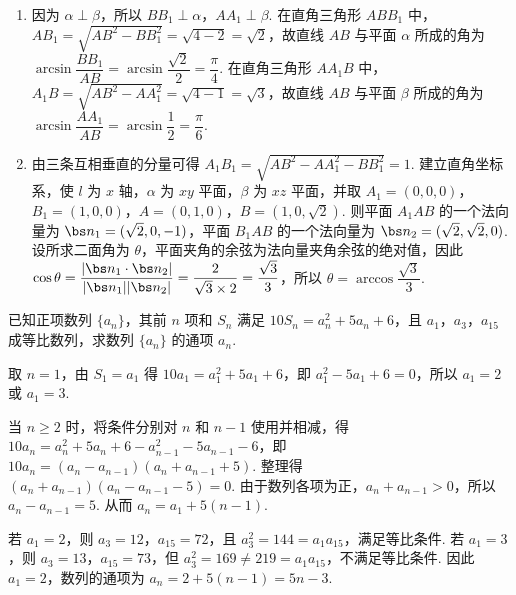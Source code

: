 \begin{solution}
\begin{enumerate}
\item 因为 \(\alpha\perp\beta\)，所以 \(BB_{1}\perp\alpha\)，\(AA_{1}\perp\beta\). 在直角三角形 \(ABB_{1}\) 中，\(AB_{1}=\sqrt{AB^{2}-BB_{1}^{2}}=\sqrt{4-2}=\sqrt{2}\)，故直线 \(AB\) 与平面 \(\alpha\) 所成的角为 \(\arcsin\dfrac{BB_{1}}{AB}=\arcsin\dfrac{\sqrt{2}}{2}=\dfrac{\pi}{4}\). 在直角三角形 \(AA_{1}B\) 中，\(A_{1}B=\sqrt{AB^{2}-AA_{1}^{2}}=\sqrt{4-1}=\sqrt{3}\)，故直线 \(AB\) 与平面 \(\beta\) 所成的角为 \(\arcsin\dfrac{AA_{1}}{AB}=\arcsin\dfrac{1}{2}=\dfrac{\pi}{6}\).
\item 由三条互相垂直的分量可得 \(A_{1}B_{1}=\sqrt{AB^{2}-AA_{1}^{2}-BB_{1}^{2}}=1\). 建立直角坐标系，使 \(l\) 为 \(x\) 轴，\(\alpha\) 为 \(xy\) 平面，\(\beta\) 为 \(xz\) 平面，并取 \(A_{1}=(0,0,0)\)，\(B_{1}=(1,0,0)\)，\(A=(0,1,0)\)，\(B=(1,0,\sqrt{2})\). 则平面 \(A_{1}AB\) 的一个法向量为 \(\bs n_{1}=(\sqrt{2},0,-1)\)，平面 \(B_{1}AB\) 的一个法向量为 \(\bs n_{2}=(\sqrt{2},\sqrt{2},0)\). 设所求二面角为 \(\theta\)，平面夹角的余弦为法向量夹角余弦的绝对值，因此 \(\cos\theta=\dfrac{\lvert\bs n_{1}\cdot\bs n_{2}\rvert}{\lvert\bs n_{1}\rvert\lvert\bs n_{2}\rvert}=\dfrac{2}{\sqrt{3}\times2}=\dfrac{\sqrt{3}}{3}\)，所以 \(\theta=\arccos\dfrac{\sqrt{3}}{3}\).
\end{enumerate}
\end{solution}

\begin{problem}
已知正项数列 \(\{a_{n}\}\)，其前 \(n\) 项和 \(S_{n}\) 满足 \(10S_{n} = a_{n}^{2} + 5a_{n} + 6\)，且 \(a_{1}\)，\(a_{3}\)，\(a_{15}\) 成等比数列，求数列 \(\{a_{n}\}\) 的通项 \(a_{n}\).
\end{problem}

\begin{solution}
取 \(n=1\)，由 \(S_{1}=a_{1}\) 得 \(10a_{1}=a_{1}^{2}+5a_{1}+6\)，即 \(a_{1}^{2}-5a_{1}+6=0\)，所以 \(a_{1}=2\) 或 \(a_{1}=3\).

当 \(n\geqslant2\) 时，将条件分别对 \(n\) 和 \(n-1\) 使用并相减，得 \(10a_{n}=a_{n}^{2}+5a_{n}+6-a_{n-1}^{2}-5a_{n-1}-6\)，即 \(10a_{n}=(a_{n}-a_{n-1})(a_{n}+a_{n-1}+5)\). 整理得 \((a_{n}+a_{n-1})(a_{n}-a_{n-1}-5)=0\). 由于数列各项为正，\(a_{n}+a_{n-1}>0\)，所以 \(a_{n}-a_{n-1}=5\). 从而 \(a_{n}=a_{1}+5(n-1)\).

若 \(a_{1}=2\)，则 \(a_{3}=12\)，\(a_{15}=72\)，且 \(a_{3}^{2}=144=a_{1}a_{15}\)，满足等比条件. 若 \(a_{1}=3\)，则 \(a_{3}=13\)，\(a_{15}=73\)，但 \(a_{3}^{2}=169\neq219=a_{1}a_{15}\)，不满足等比条件. 因此 \(a_{1}=2\)，数列的通项为 \(a_{n}=2+5(n-1)=5n-3\).
\end{solution}

